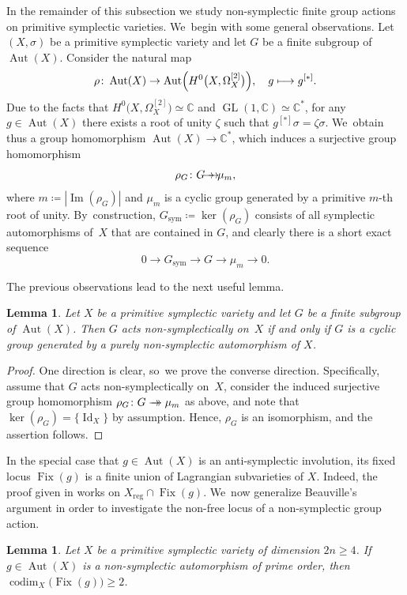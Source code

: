 \documentclass[JEP,XML,SOM,Unicode,published]{cedram}
\newcommand\mto{\mathchoice{\longmapsto}{\mapsto}{\mapsto}{\mapsto}}
\newcommand{\onto}{\mathchoice{\to\hspace*{-5mm}\to}{\mathrel{\hbox{$\to\hspace*{-2.85mm}\to$}}}{\to\hspace*{-3mm}\to}{\to\hspace*{-3mm}\to}}
\theoremstyle{plain}
\newtheorem{lem}[thm]{Lemma}
\theoremstyle{definition}
\newcommand{\C}{\mathbb{C}}
\DeclareMathOperator{\codim}{codim}
\DeclareMathOperator{\Id}{Id}
\DeclareMathOperator{\Aut}{Aut}
\DeclareMathOperator{\Fix}{Fix}
\DeclareMathOperator{\Ima}{Im}
\DeclareMathOperator{\GL}{GL}
\begin{document}
In the remainder of this subsection we study non-symplectic finite group actions on primitive symplectic varieties. We~begin with some general observations.
Let $(X,\sigma)$ be a primitive symplectic variety and let $G$ be a finite subgroup of $\Aut(X)$. Consider the natural map
\[
\rho\colon \Aut(X)\to \Aut \Bigl(H^0 \bigl(X,\Omega_{X}^{[2]} \bigr) \Bigr), \quad g \mto g^{[*]}.
\]
Due to the facts that $H^0 \bigl(X,\Omega_{X}^{[2]} \bigr) \simeq \C$ and $\GL(1,\C)\simeq \C^*$, for any $g\in\Aut(X)$ there exists a root of unity $\zeta$ such that $g^{[*]} \sigma = \zeta \sigma$. We~obtain thus a group homomorphism
$\Aut(X) \to \C^* $, which induces a surjective group homomorphism
\[
\rho_G \colon G \onto \mu_m,
\]
where $m \coloneqq |\Ima(\rho_G)|$ and $\mu_m$ is a cyclic group generated by a primitive $m$-th root of unity. By~construction, $G_\text{sym} \coloneqq \ker(\rho_G)$ consists of all symplectic automorphisms of~$X$ that are contained in $G$, and clearly there is a short exact sequence
\[
0 \longrightarrow G_\text{sym} \longrightarrow G \longrightarrow \mu_m \longrightarrow 0.
\]

The previous observations lead to the next useful lemma.

\begin{lem}
\label{lem:group_acting_nonsymplectically_cyclic}
Let $X$ be a primitive symplectic variety and let $G$ be a finite subgroup of $\Aut(X)$. Then $G$ acts non-symplectically on~$X$ if and only if $G$ is a cyclic group generated by a purely non-symplectic automorphism of $X$.
\end{lem}

\begin{proof}
One direction is clear, so~we prove the converse direction. Specifically, assume that $G$ acts non-symplectically on~$X$, consider the induced surjective group homomorphism
$ \rho_G \colon G \onto \mu_m $ as above, and note that $\ker (\rho_G) = \{ \Id_X \}$ by assumption. Hence, $\rho_G$ is an isomorphism, and the assertion follows.
\end{proof}

In the special case that $g \in \Aut(X)$ is an anti-symplectic involution, its fixed locus $\Fix(g)$ is a finite union of Lagrangian subvarieties of $X$. Indeed, the proof given in \cite[Lem.\,1]{Beauville11} works on $X_{\text{reg}} \cap \Fix(g)$. We~now generalize Beauville's argument in order to investigate the non-free locus of a non-symplectic group action.

\begin{lem}
\label{lem:prime_order_non-symplectic}
Let $X$ be a primitive symplectic variety of dimension $2n \geq 4$. If~$g \in \Aut(X)$ is a non-symplectic automorphism of prime order, then $\codim_X \bigl(\Fix(g) \bigr) \geq 2$.
\end{lem}
\end{document}
